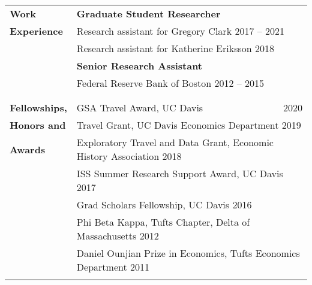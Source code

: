 \documentclass[letterpaper,11pt,oneside]{article}
\begin{document}
\begin{longtable}{@{} p{0.15\linewidth} p{0.8\linewidth} p{0.05\linewidth}}
     \\


  \textbf{\large{Work }}    &  \multicolumn{2}{l}{ \textbf{Graduate Student Researcher}}\\
  \textbf{\large{Experience}}     &  \multicolumn{2}{l}{ Research assistant for Gregory Clark \hfill 2017 -- 2021 }\\

     &  \multicolumn{2}{l}{ Research assistant for Katherine Eriksson \hfill 2018}\\
    &  \multicolumn{2}{l}{ \textbf{Senior Research Assistant } }\\
    &  \multicolumn{2}{l}{ Federal Reserve Bank of Boston \hfill   2012 -- 2015}\\
     \\
     \\

 \textbf{\large{Fellowships,}}   &  GSA Travel Award, UC Davis & \hfill  2020\\
  \textbf{\large{Honors and }}   &  \multicolumn{2}{l}{ Travel Grant, UC Davis Economics Department \hfill 2019}\\  
  \textbf{\large{Awards}}  &  \multicolumn{2}{l}{ Exploratory Travel and Data Grant, Economic History Association \hfill 2018}\\
  &  \multicolumn{2}{l}{ ISS Summer Research Support Award, UC Davis \hfill 2017}\\
  &  \multicolumn{2}{l}{ Grad Scholars Fellowship, UC Davis \hfill  2016}\\
  &  \multicolumn{2}{l}{ Phi Beta Kappa, Tufts Chapter, Delta of Massachusetts \hfill 2012}\\
  &   \multicolumn{2}{l}{ Daniel Ounjian Prize in Economics, Tufts Economics Department \hfill 2011}\\
  \\


      


\end{longtable}
\end{document}

